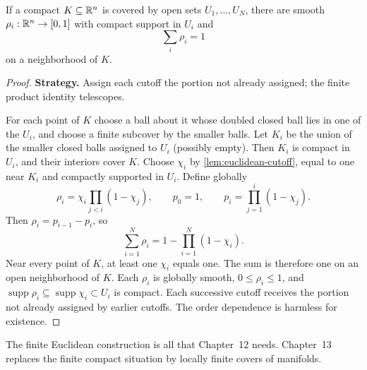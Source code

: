 \begin{theorem}\label{thm:finite-euclidean-pou}
If a compact $K\subseteq\mathbb{R}^n$ is covered by open sets $U_1,\ldots,U_N$,
there are smooth $\rho_i:\mathbb{R}^n\to[0,1]$ with compact support in $U_i$
and
\[
\sum_i\rho_i=1
\]
 on a neighborhood of $K$.
\end{theorem}
\begin{proof}
\textbf{Strategy.} Assign each cutoff the portion not already assigned;
the finite product identity telescopes.

For each point of $K$ choose a ball about it whose doubled closed ball
lies in one of the $U_i$, and choose a finite subcover by the smaller
balls. Let $K_i$ be the union of the smaller closed balls assigned to
$U_i$ (possibly empty). Then $K_i$ is compact in $U_i$, and their
interiors cover $K$. Choose $\chi_i$ by \cref{lem:euclidean-cutoff}, equal
to one near $K_i$ and compactly supported in $U_i$.
Define globally
\[
\rho_i=\chi_i\prod_{j<i}(1-\chi_j),\qquad
p_0=1,\qquad p_i=\prod_{j=1}^i(1-\chi_j).
\]
Then $\rho_i=p_{i-1}-p_i$, so
\[
\sum_{i=1}^N\rho_i=1-\prod_{i=1}^N(1-\chi_i).
\]
Near every point of $K$, at least one $\chi_i$ equals one. The sum is
therefore one on an open neighborhood of $K$. Each $\rho_i$ is globally
smooth, $0\leq\rho_i\leq1$, and
$\operatorname{supp}\rho_i\subseteq\operatorname{supp}\chi_i\subset U_i$
is compact. Each successive cutoff receives the portion not already
assigned by earlier cutoffs. The order dependence is harmless for existence.
\end{proof}
The finite Euclidean construction is all that Chapter~12 needs. Chapter~13
replaces the finite compact situation by locally finite covers of manifolds.

